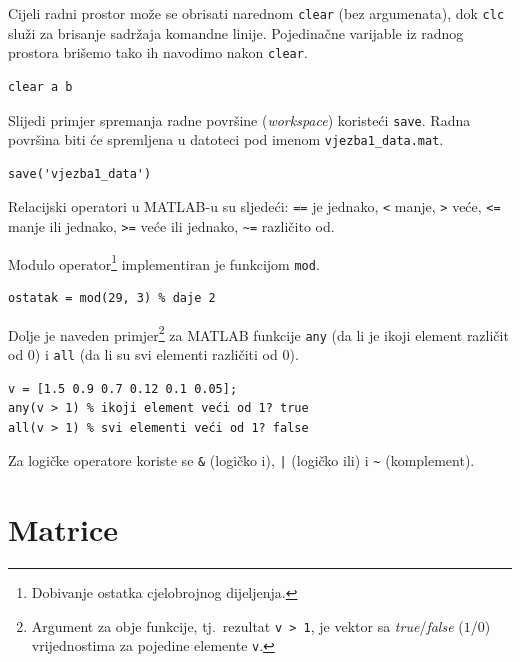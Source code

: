 \documentclass[a4paper, 10pt]{article}
\begin{document}
Cijeli radni prostor može se obrisati narednom \texttt{clear} (bez argumenata), dok \texttt{clc} služi za brisanje sadržaja komandne linije.
Pojedinačne varijable iz radnog prostora brišemo tako ih navodimo nakon \texttt{clear}.

\begin{lstlisting}
clear a b
\end{lstlisting}
Slijedi primjer spremanja radne površine (\emph{workspace}) koristeći \texttt{save}. Radna površina biti će spremljena u datoteci pod imenom \texttt{vjezba1\_data.mat}.

\begin{lstlisting}
save('vjezba1_data')
\end{lstlisting}

Relacijski operatori u MATLAB-u su sljedeći: \texttt{==} je jednako, \texttt{<} manje, \texttt{>} veće, \texttt{<=} manje ili jednako, \texttt{>=} veće ili jednako, \texttt{\textasciitilde=} različito od.

Modulo operator\footnote{Dobivanje ostatka cjelobrojnog dijeljenja.} implementiran je funkcijom \texttt{mod}.

\begin{lstlisting}
ostatak = mod(29, 3) % daje 2
\end{lstlisting}

Dolje je naveden primjer\footnote{Argument za obje funkcije, tj.\ rezultat \texttt{v > 1}, je vektor sa \emph{true}/\emph{false} ($1$/$0$) vrijednostima za pojedine elemente \texttt{v}.}
za MATLAB funkcije \texttt{any} (da li je ikoji element različit od $0$) i \texttt{all} (da li su svi elementi različiti od $0$).

\begin{lstlisting}
v = [1.5 0.9 0.7 0.12 0.1 0.05];
any(v > 1) % ikoji element veći od 1? true
all(v > 1) % svi elementi veći od 1? false
\end{lstlisting}

Za logičke operatore koriste se \texttt{\&} (logičko i), \texttt{|} (logičko ili) i \texttt{\textasciitilde} (komplement).


\section{Matrice}
\label{sec:matrice}
\end{document}
